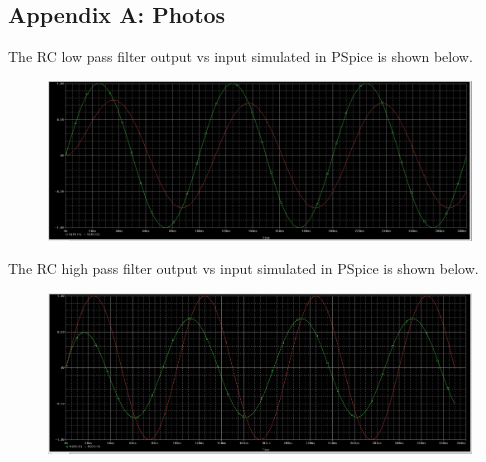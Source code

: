 \documentclass[11pt]{article}
\begin{document}
	\subsection*{Appendix A: Photos}
	The RC low pass filter output vs input simulated in PSpice is shown below. 
	\begin{figure}[H]
		    \centering
		    \includegraphics[width=5in]{images/PSpice RC Low Pass.PNG}
		\end{figure}
	The RC high pass filter output vs input simulated in PSpice is shown below.
	\begin{figure}[H]
		    \centering
		    \includegraphics[width=5in]{images/RC High Pass.PNG}
		\end{figure}
	
	
\end{document}
